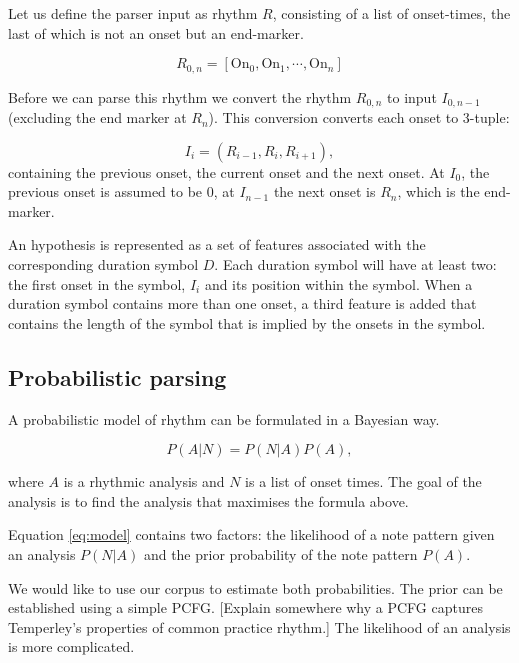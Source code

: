 \documentclass[a4paper,10pt]{article}
\begin{document}
Let us define the parser input as rhythm $R$, consisting of a list of onset-times, the last of which is not an onset but an end-marker. 

\begin{equation}
R_{0,n} = [\textrm{On}_0, \textrm{On}_{1}, \cdots, \textrm{On}_n]
\end{equation}

Before we can parse this rhythm we convert the rhythm $R_{0,n}$ to input $I_{0,n-1}$ (excluding the end marker at $R_n$). This conversion converts each onset to 3-tuple:

\begin{equation}
I_i = (R_{i-1}, R_i, R_{i+1}),
\end{equation}
containing the previous onset, the current onset and the next onset. At $I_0$, the previous onset is assumed to be $0$, at $I_{n-1}$ the next onset is $R_n$, which is the end-marker. 

An hypothesis is represented as a set of features associated with the corresponding duration symbol $D$. Each duration symbol will have at least two: the first onset in the symbol, $I_i$ and its position within the symbol. When a duration symbol contains more than one onset, a third feature is added that contains the length of the symbol that is implied by the onsets in the symbol.

\subsection*{Probabilistic parsing}

A probabilistic model of rhythm can be formulated in a Bayesian way. 

\begin{equation}
\label{eq:model}
P(A|N) = P(N|A)P(A),
\end{equation}

where $A$ is a rhythmic analysis and $N$ is a list of onset times. The goal of the analysis is to find the analysis that maximises the formula above.

Equation \ref{eq:model} contains two factors: the likelihood of a note pattern given an analysis $P(N|A)$ and the prior probability of the note pattern $P(A)$. 

We would like to use our corpus to estimate both probabilities. The prior can be established using a simple PCFG. [Explain somewhere why a PCFG captures Temperley's properties of common practice rhythm.] The likelihood of an analysis is more complicated.
\end{document}
